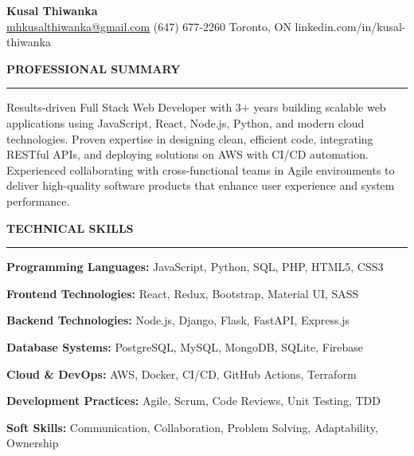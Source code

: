 \documentclass[10pt,letterpaper]{article}
\begin{document}
\begin{center}
{\LARGE\textbf{Kusal Thiwanka}}\\[3pt]
\href{mailto:mhkusalthiwanka@gmail.com}{mhkusalthiwanka@gmail.com}\hspace{2em}%
(647) 677{-}2260\hspace{2em}%
Toronto, ON\hspace{2em}
linkedin.com/in/kusal-thiwanka
\end{center}

\vspace{6pt}

\textbf{PROFESSIONAL SUMMARY}\\[-8pt]
\noindent\rule{\textwidth}{1pt}

\vspace{-2pt}

Results-driven Full Stack Web Developer with 3+ years building scalable web applications using JavaScript, React, Node.js, Python, and modern cloud technologies. Proven expertise in designing clean, efficient code, integrating RESTful APIs, and deploying solutions on AWS with CI/CD automation. Experienced collaborating with cross-functional teams in Agile environments to deliver high-quality software products that enhance user experience and system performance.

\vspace{8pt}

\textbf{TECHNICAL SKILLS}\\[-8pt]
\noindent\rule{\textwidth}{1pt}

\vspace{-2pt}

\textbf{Programming Languages:} JavaScript, Python, SQL, PHP, HTML5, CSS3

\textbf{Frontend Technologies:} React, Redux, Bootstrap, Material UI, SASS

\textbf{Backend Technologies:} Node.js, Django, Flask, FastAPI, Express.js

\textbf{Database Systems:} PostgreSQL, MySQL, MongoDB, SQLite, Firebase

\textbf{Cloud \& DevOps:} AWS, Docker, CI/CD, GitHub Actions, Terraform

\textbf{Development Practices:} Agile, Scrum, Code Reviews, Unit Testing, TDD

\textbf{Soft Skills:} Communication, Collaboration, Problem Solving, Adaptability, Ownership

\vspace{8pt}
\end{document}
